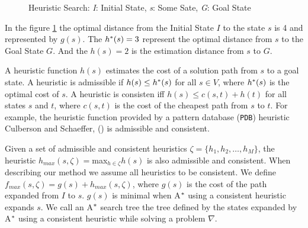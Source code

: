\begin{figure}[htb]
\centering
{}
\caption{Heuristic Search: \textit{I}: Initial State, \textit{s}: Some Sate, \textit{G}: Goal State} \label{fig:searchSpace}
\end{figure}

In the figure \ref{fig:searchSpace} the optimal distance from the Initial State $I$ to  the state $s$ is 4 and represented by $g(s)$. The $h\sp{*}(s) = 3$ represent the optimal distance from $s$ to the Goal State $G$. And the $h(s) = 2$ is the estimation distance from $s$ to $G$.

A heuristic function $h(s)$ estimates the cost of a solution path from $s$ to a goal state. A heuristic is admissible if $h(s) \leq h\sp{*}(s)$ for all $s \in V$, where $h\sp{*}(s)$ is the optimal cost of $s$. A heuristic is consisten iff $h(s) \leq c(s,t) + h(t)$ for all states $s$ and $t$, where $c(s,t)$ is the cost of the cheapest path from $s$ to $t$. For example, the heuristic function provided by a pattern database (\texttt{PDB}) heuristic Culberson and Schaeffer, (\citeyear{culberson1998pattern}) is admissible and consistent.

Given a set of admissible and consistent heuristics $\zeta = \{h_{1}, h_{2}, \dots, h_{M}\}$, the heuristic $h_{max}(s,\zeta) = $max$_{h \in \zeta} h(s)$ is also admissible and consistent. When describing our method we assume all heuristics to be consistent. We define $f_{max}(s, \zeta) = g(s) + h_{max}(s, \zeta)$, where $g(s)$ is the cost of the path expanded from $I$ to $s$. $g(s)$ is minimal when A$\sp{*}$ using a consistent heuristic expands $s$. We call an A$\sp{*}$ search tree the tree defined by the states expanded by A$\sp{*}$ using a consistent heuristic while solving a problem $\nabla$.

